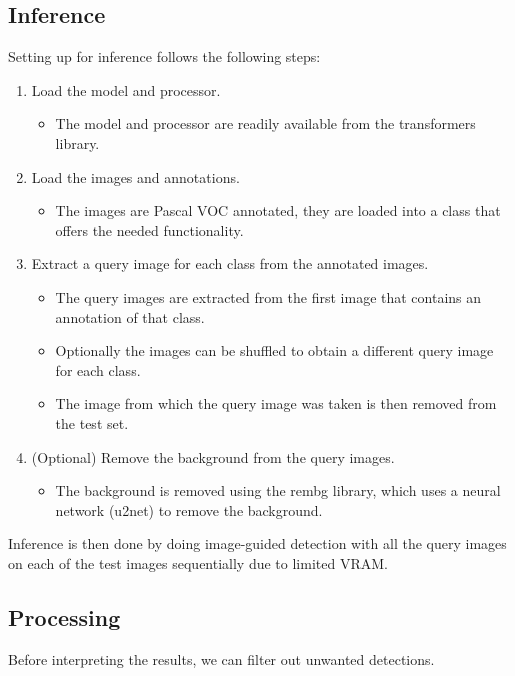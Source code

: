 \subsection{Inference}
Setting up for inference follows the following steps:
\begin{enumerate}
    \item Load the model and processor.
        \begin{itemize}
            \item The model and processor are readily available from the transformers library.
        \end{itemize}
    \item Load the images and annotations.
        \begin{itemize}
            \item The images are Pascal VOC annotated, they are loaded into a class that offers the needed functionality.
        \end{itemize}
    \item Extract a query image for each class from the annotated images.
        \begin{itemize}
            \item The query images are extracted from the first image that contains an annotation of that class.
            \item Optionally the images can be shuffled to obtain a different query image for each class.
            \item The image from which the query image was taken is then removed from the test set. 
        \end{itemize}
    \item (Optional) Remove the background from the query images.
        \begin{itemize}
            \item The background is removed using the rembg library, which uses a neural network (u2net) to remove the background.
        \end{itemize}
\end{enumerate}
Inference is then done by doing image-guided detection with all the query images on each of the test images sequentially due to limited VRAM. 

\subsection{Processing}

Before interpreting the results, we can filter out unwanted detections. 


